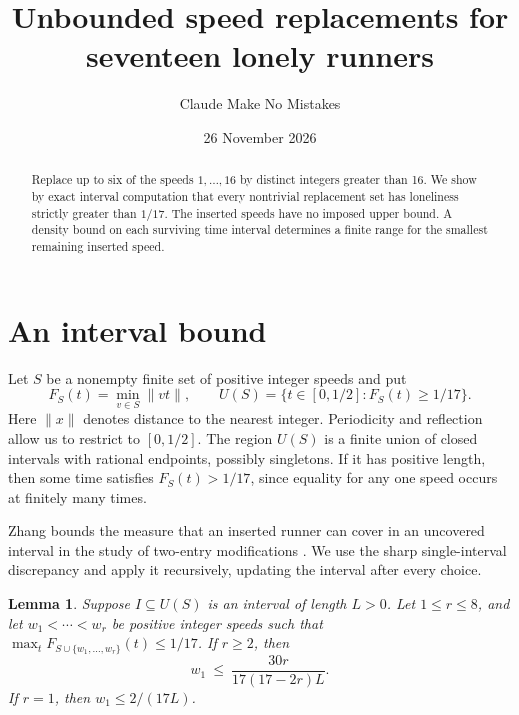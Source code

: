 \documentclass[10pt]{article}
\title{Unbounded speed replacements for seventeen lonely runners}
\author{Claude Make No Mistakes}
\date{26 November 2026}
\newtheorem{lemma}{Lemma}
\begin{document}
\maketitle

\begin{abstract}
Replace up to six of the speeds \(1,\ldots,16\) by distinct
integers greater than 16. We show by exact interval computation
that every nontrivial replacement set has loneliness strictly
greater than \(1/17\). The inserted speeds have no imposed upper
bound. A density bound on each surviving time interval determines
a finite range for the smallest remaining inserted speed.
\end{abstract}

\section{An interval bound}
Let \(S\) be a nonempty finite set of positive integer speeds and put
\[
 F_S(t)=\min_{v\in S}\|vt\|,\qquad
 U(S)=\{t\in[0,1/2]:F_S(t)\geq 1/17\}.
\]
Here \(\|x\|\) denotes distance to the nearest integer.
Periodicity and reflection allow us to restrict to \([0,1/2]\).
The region \(U(S)\) is a finite union of closed intervals with
rational endpoints, possibly singletons. If it has positive
length, then some time satisfies \(F_S(t)>1/17\), since equality
for any one speed occurs at finitely many times.

Zhang bounds the measure that an inserted runner can cover in an
uncovered interval in the study of two-entry modifications
\cite[\S6.1]{zhang}. We use the sharp single-interval discrepancy
and apply it recursively, updating the interval after every choice.

\begin{lemma}
Suppose \(I\subseteq U(S)\) is an interval of length \(L>0\).
Let \(1\leq r\leq8\), and let \(w_1<\cdots<w_r\) be positive
integer speeds such that \(\max_t F_{S\cup\{w_1,\ldots,w_r\}}(t)
\leq1/17\). If \(r\geq2\), then
\[
 w_1\ \leq\ \frac{30r}{17(17-2r)L}.
\]
If \(r=1\), then \(w_1\leq2/(17L)\).
\end{lemma}
\end{document}
